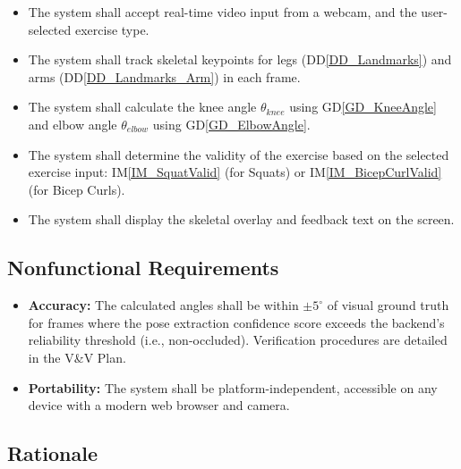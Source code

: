 \documentclass[12pt]{article}
\newcommand{\dref}[1]{GD\ref{#1}}
\newcommand{\ddref}[1]{DD\ref{#1}}
\newcommand{\iref}[1]{IM\ref{#1}}
\newcounter{reqnum} %
\newcounter{nfrnum} %
\begin{document}
\noindent \begin{itemize}

\item[R\refstepcounter{reqnum}\thereqnum \label{R_Input}:] The system shall accept real-time video input from a webcam, and the user-selected exercise type.
\item[R\refstepcounter{reqnum}\thereqnum \label{R_Process}:] The system shall track skeletal keypoints for legs (\ddref{DD_Landmarks}) and arms (\ddref{DD_Landmarks_Arm}) in each frame.
\item[R\refstepcounter{reqnum}\thereqnum \label{R_Calc}:] The system shall calculate the knee angle $\theta_{knee}$ using \dref{GD_KneeAngle} and elbow angle $\theta_{elbow}$ using \dref{GD_ElbowAngle}.
\item[R\refstepcounter{reqnum}\thereqnum \label{R_Verify}:] The system shall determine the validity of the exercise based on the selected exercise input: \iref{IM_SquatValid} (for Squats) or \iref{IM_BicepCurlValid} (for Bicep Curls).
\item[R\refstepcounter{reqnum}\thereqnum \label{R_Output}:] The system shall display the skeletal overlay and feedback text on the screen.

\end{itemize}

\subsection{Nonfunctional Requirements}

\noindent \begin{itemize}

\item[NFR\refstepcounter{nfrnum}\thenfrnum \label{NFR_Accuracy}:] \textbf{Accuracy:} The calculated angles shall be within $\pm 5^\circ$ of visual ground truth for frames where the pose extraction confidence score exceeds the backend's reliability threshold (i.e., non-occluded). Verification procedures are detailed in the V\&V Plan.
\item[NFR\refstepcounter{nfrnum}\thenfrnum \label{NFR_Portability}:] \textbf{Portability:} The system shall be platform-independent, accessible on any device with a modern web browser and camera.


\end{itemize}

\subsection{Rationale}\label{SecRationale}
\end{document}
